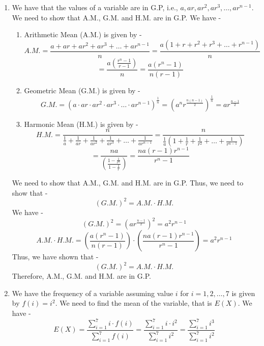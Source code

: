 \begin{enumerate}
\begin{enumerate}
    \[20 x_1 + 20 x_2 = 6000\]
    \[x_1 + x_2 = 300 \quad \ldots (1)\]
    We also have the total number of families as 1000. Thus, we have -
    \[50 + x_1 + 500 + x_2 + 50 = 1000\]
    \[x_1 + x_2 = 400 \quad \ldots (2)\]
    Solving equations (1) and (2), we get a contradiction. Thus, there is no solution for $x_1$ and $x_2$ such that the mode is Rs. 87.5.
    \[\boxed{\text{No solution for } (x_1, x_2)
    }\]
    \end{enumerate}
    \item We have that the values of a variable are in G.P, i.e., $a, ar, ar^2, ar^3, \ldots, ar^{n-1}$. We need to show that A.M., G.M. and H.M. are in G.P. We have -
    \begin{enumerate}
        \item Arithmetic Mean (A.M.) is given by -
        \[A.M. = \frac{a + ar + ar^2 + ar^3 + \ldots + ar^{n-1}}{n} = \frac{a(1 + r + r^2 + r^3 + \ldots + r^{n-1})}{n}\]
        \[= \frac{a\left(\frac{r^n - 1}{r - 1}\right)}{n} = \frac{a(r^n - 1)}{n(r - 1)}\]
        \item Geometric Mean (G.M.) is given by -
        \[G.M. = (a \cdot ar \cdot ar^2 \cdot ar^3 \cdot \ldots \cdot ar^{n-1})^{\frac{1}{n}} = (a^n r^{\frac{n(n-1)}{2}})^{\frac{1}{n}} = a r^{\frac{n-1}{2}}\]
        \item Harmonic Mean (H.M.) is given by -
        \[H.M. = \frac{n}{\frac{1}{a} + \frac{1}{ar} + \frac{1}{ar^2} + \frac{1}{ar^3} + \ldots + \frac{1}{ar^{n-1}}} = \frac{n}{\frac{1}{a}(1 + \frac{1}{r} + \frac{1}{r^2} + \ldots + \frac{1}{r^{n-1}})}\]
        \[= \frac{na}{\left(\frac{1 - \frac{1}{r^n}}{1 - \frac{1}{r}}\right)} = \frac{na(r - 1)r^{n-1}}{r^n - 1}\]
    \end{enumerate}
    We need to show that A.M., G.M. and H.M. are in G.P. Thus, we need to show that -
    \[(G.M.)^2 = A.M. \cdot H.M.\]
    We have -
    \[(G.M.)^2 = (a r^{\frac{n-1}{2}})^2 = a^2 r^{n-1}\]
    \[A.M. \cdot H.M. = \left(\frac{a(r^n - 1)}{n(r - 1)}\right) \cdot \left(\frac{na(r - 1)r^{n-1}}{r^n - 1}\right) = a^2 r^{n-1}\]
    Thus, we have shown that -
    \[(G.M.)^2 = A.M. \cdot H.M.\]
    Therefore, A.M., G.M. and H.M. are in G.P.
    \item We have the frequency of a variable assuming value $i$ for $i = 1, 2, \ldots, 7$ is given by $f(i) = i^2$. We need to find the mean of the variable, that is $E(X)$. We have -
    \[E(X) = \frac{\sum_{i=1}^{7} i \cdot f(i)}{\sum_{i=1}^{7} f(i)} = \frac{\sum_{i=1}^{7} i \cdot i^2}{\sum_{i=1}^{7} i^2} = \frac{\sum_{i=1}^{7} i^3}{\sum_{i=1}^{7} i^2}\]

\end{enumerate}
